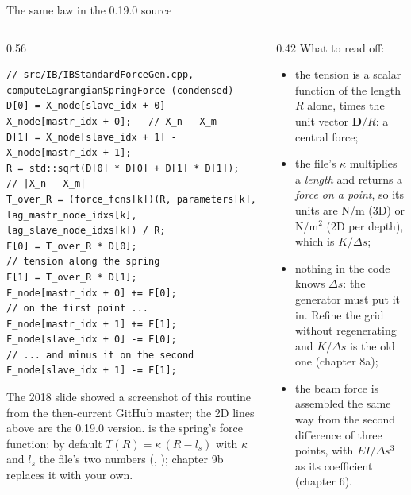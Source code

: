 \documentclass[aspectratio=169,11pt]{beamer}
\begin{document}
\begin{frame}[fragile]{The same law in the 0.19.0 source}
\label{fr:springcode}
\begin{columns}[T,onlytextwidth]
\begin{column}{0.56\textwidth}
\begin{lstlisting}[style=cpptiny]
// src/IB/IBStandardForceGen.cpp, computeLagrangianSpringForce (condensed)
D[0] = X_node[slave_idx + 0] - X_node[mastr_idx + 0];   // X_n - X_m
D[1] = X_node[slave_idx + 1] - X_node[mastr_idx + 1];
R = std::sqrt(D[0] * D[0] + D[1] * D[1]);               // |X_n - X_m|
T_over_R = (force_fcns[k])(R, parameters[k], lag_mastr_node_idxs[k], lag_slave_node_idxs[k]) / R;
F[0] = T_over_R * D[0];                                 // tension along the spring
F[1] = T_over_R * D[1];
F_node[mastr_idx + 0] += F[0];                          // on the first point ...
F_node[mastr_idx + 1] += F[1];
F_node[slave_idx + 0] -= F[0];                          // ... and minus it on the second
F_node[slave_idx + 1] -= F[1];
\end{lstlisting}
\footnotesize The 2018 slide showed a screenshot of this routine from the then-current GitHub master; the 2D lines above are the 0.19.0 version.  is the spring's force function: by default $T(R) = \kappa\,(R - l_s)$ with $\kappa$ and $l_s$ the file's two numbers (, \code{[1]}); chapter 9b replaces it with your own.
\end{column}
\begin{column}{0.42\textwidth}
\footnotesize What to read off:
\begin{itemize}
  \item the tension is a scalar function of the length $R$ alone, times the unit vector $\mathbf{D}/R$: a central force;
  \item the file's $\kappa$ multiplies a \emph{length} and returns a \emph{force on a point}, so its units are N/m (3D) or N/m$^2$ (2D per depth), which is $K/\Delta s$;
  \item nothing in the code knows $\Delta s$: the generator must put it in. Refine the grid without regenerating and $K/\Delta s$ is the old one (chapter 8a);
  \item the beam force is assembled the same way from the second difference of three points, with $EI/\Delta s^3$ as its coefficient (chapter 6).
\end{itemize}
\end{column}
\end{columns}
\end{frame}
\end{document}
